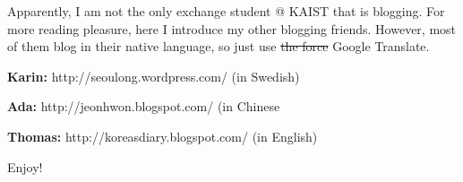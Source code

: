\begin{post}
	\begin{content}
Apparently, I am not the only exchange student @ KAIST that is blogging. For more reading pleasure, here I introduce my other blogging friends. However, most of them blog in their native language, so just use \sout{the force} Google Translate.

\begin{itemize*}
	\item \textbf{Karin:} http://seoulong.wordpress.com/ (in Swedish)
	\item \textbf{Ada:} http://jeonhwon.blogspot.com/ (in Chinese
	\item \textbf{Thomas:} http://koreasdiary.blogspot.com/ (in English)
\end{itemize*}

Enjoy!
	\end{content}
\end{post}
